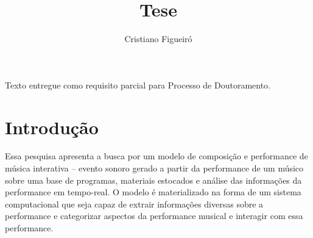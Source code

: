 \documentclass{ppgmus}
\begin{document}
 


\capa
\begin{dadosTese}
Texto entregue como requisito parcial para Processo de Doutoramento.
\end{dadosTese}


\title{Tese}
\author{Cristiano Figueiró}



\tableofcontents

\newpage

%  
% 
% 
% 
% 
% 

\chapter{Introdução}
\label{sec:intro}


Essa pesquisa apresenta a busca por um modelo de composição e
performance de música interativa – evento sonoro gerado a partir da
performance de um músico sobre uma base de programas, materiais
estocados e análise das informações da performance em tempo-real. O
modelo é materializado na forma de um sistema computacional que seja
capaz de extrair informações diversas sobre a performance e
categorizar aspectos da performance musical e interagir com essa performance.
\end{document}
